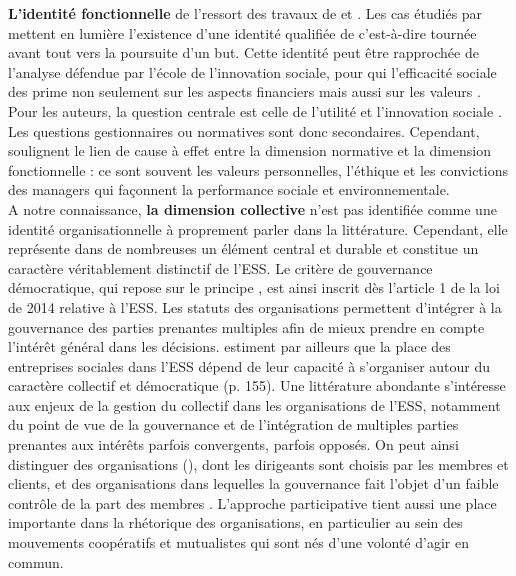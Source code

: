         \textbf{L'identité fonctionnelle} de l'\ess ressort des travaux de \textcite{young2001organizational, young2000alternative} et \textcite{mariaux2018leconomie}. Les cas étudiés par \textcite[][p.292]{young2001organizational} mettent en lumière l'existence d'une identité qualifiée de  c'est-à-dire tournée avant tout vers la poursuite d'un but. Cette identité peut être rapprochée de l'analyse défendue par l'école de l'innovation sociale, pour qui l'efficacité sociale des \oess prime non seulement sur les aspects financiers mais aussi sur les valeurs \parencite{defourny2011approches}. Pour les auteurs, la question centrale est celle de l'utilité et l'innovation sociale \parencite{dees2003social}. Les questions gestionnaires ou normatives sont donc secondaires. Cependant, \textcite{auger2014les} soulignent le lien de cause à effet entre la dimension normative et la dimension fonctionnelle : ce sont souvent les valeurs personnelles, l'éthique et les convictions des managers qui façonnent la performance sociale et environnementale.  \\

        A notre connaissance, \textbf{la dimension collective} n'est pas identifiée comme une identité organisationnelle à proprement parler dans la littérature. Cependant, elle représente dans de nombreuses \oess un élément central et durable et constitue un caractère véritablement distinctif de l'ESS. Le critère de gouvernance démocratique, qui repose sur le principe , est ainsi inscrit dès l'article 1 de la loi de 2014 relative à l'ESS. Les statuts des organisations permettent d'intégrer à la gouvernance des parties prenantes multiples afin de mieux prendre en compte l'intérêt général dans les décisions. \textcite{petrella2014social} estiment par ailleurs que la place des entreprises sociales dans l'ESS dépend de leur capacité à s'organiser autour du caractère collectif et démocratique (p. 155). Une littérature abondante s'intéresse aux enjeux de la gestion du collectif dans les organisations de l'ESS, notamment du point de vue de la gouvernance et de l'intégration de multiples parties prenantes aux intérêts parfois convergents, parfois opposés. On peut ainsi distinguer des organisations  (), dont les dirigeants sont choisis par les membres et clients, et des organisations  dans lequelles la gouvernance fait l'objet d'un faible contrôle de la part des membres \parencite[][p.841]{hansmann1980role}. L'approche participative tient aussi une place importante dans la rhétorique des organisations, en particulier au sein des mouvements coopératifs et mutualistes qui sont nés d'une volonté d'agir en commun.
